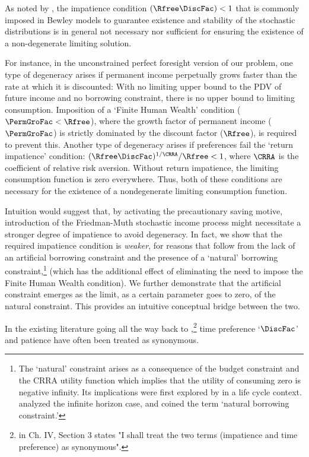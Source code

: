\documentclass[BufferStockTheory]{subfiles}
\begin{document}
As noted by \cite{szeidlInvariant}, the impatience condition $(\Rfree \DiscFac) < 1$ that is commonly imposed in Bewley models to guarantee existence and stability of the stochastic distributions is in general not necessary nor sufficient for ensuring the existence of a non-degenerate limiting solution.

For instance, in the unconstrained perfect foresight version of our problem, one type of degeneracy arises if permanent income perpetually grows faster than the rate at which it is discounted: With no limiting upper bound to the PDV of future income and no borrowing constraint, there is no upper bound to limiting consumption. Imposition of a `Finite Human Wealth' condition ($\PermGroFac < \Rfree$), where the growth factor of permanent income ($\PermGroFac$) is strictly dominated by the discount factor ($\Rfree$), is required to prevent this. Another type of degeneracy arises if preferences fail the `return impatience' condition: $\APFacRaw/\Rfree < 1$, where $\CRRA$ is the coefficient of relative risk aversion. Without return impatience, the limiting consumption function is zero everywhere. Thus, both of these conditions are necessary for the existence of a nondegenerate limiting consumption function.






Intuition would suggest that, by activating the precautionary saving motive, introduction of the Friedman-Muth stochastic income process might necessitate a stronger degree of impatience to avoid degeneracy. In fact, we show that the required impatience condition is \textit{weaker}, for reasons that follow from the lack of an artificial borrowing constraint and the presence of a `natural' borrowing constraint,\footnote{The `natural' constraint arises as a consequence of the budget constraint and the CRRA utility function which implies that the utility of consuming zero is negative infinity.  Its implications were first explored by \cite{zeldesStochastic} in a life cycle context. \cite{carroll:brookings} analyzed the infinite horizon case, and \cite{aiyagari:ge} coined the term `natural borrowing constraint.'} (which has the additional effect of eliminating the need to impose the Finite Human Wealth condition). We further demonstrate that the artificial constraint emerges as the limit, as a certain parameter goes to zero, of the natural constraint. This provides an intuitive conceptual bridge between the two.

In the existing literature going all the way back to \cite{fisherInterestTheory},\footnote{\cite{fisherInterestTheory} in Ch. IV, Section 3 states "I shall treat the two terms (impatience and time preference) as synonymous".} time preference `$\DiscFac$' and patience have often been treated as synonymous. 
\end{document}
